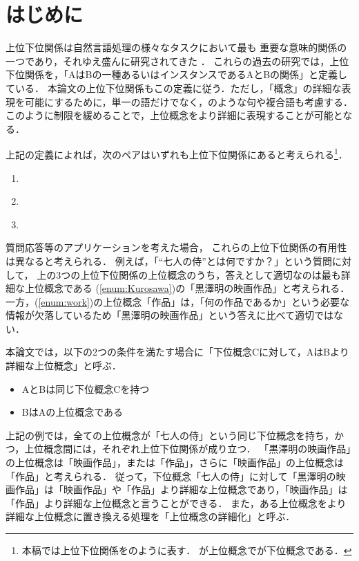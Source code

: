 \documentclass[japanese]{jnlp_1.4}
\newcommand{\xmp}[1]{}
\newcommand{\isa}[2]{}
\begin{document}
\maketitle


\section{はじめに}

上位下位関係は自然言語処理の様々なタスクにおいて最も
重要な意味的関係の一つであり，それゆえ盛んに研究されてきた
\cite{hearst92,hovy09,oh09,ponzetto07,隅田:吉永:鳥澤:2009,suchanek07,nastase08,snow05}．
これらの過去の研究では，上位下位関係を，「AはBの一種あるいはインスタンスであるAとBの関係」と定義している．
本論文の上位下位関係もこの定義に従う．ただし，「概念」の詳細な表現を可能にするために，単一の語だけでなく，\xmp{黒澤明の映画作品}のような句や複合語も考慮する．
このように制限を緩めることで，上位概念をより詳細に表現することが可能となる．

上記の定義によれば，次のペアはいずれも上位下位関係にあると考えられる\footnote{
本稿では上位下位関係を\isa{A}{B}のように表す．
\xmp{A}が上位概念で\xmp{B}が下位概念である．
}．
\begin{enumerate}
\item \isa{黒澤明の映画作品}{七人の侍}
	\label{enum:Kurosawa}
\item \isa{映画作品}{七人の侍}
\item \isa{作品}{七人の侍}
	\label{enum:work}
\end{enumerate}


質問応答等のアプリケーションを考えた場合，
これらの上位下位関係の有用性は異なると考えられる．
例えば，「``七人の侍''とは何ですか？」という質問に対して，
上の3つの上位下位関係の上位概念のうち，答えとして適切なのは最も詳細な上位概念である
(\ref{enum:Kurosawa})の「黒澤明の映画作品」と考えられる．
一方，(\ref{enum:work})の上位概念「作品」は，「何の作品であるか」という必要な情報が欠落しているため「黒澤明の映画作品」という答えに比べて適切ではない．

本論文では，以下の2つの条件を満たす場合に「下位概念Cに対して，AはBより詳細な上位概念」と呼ぶ．
\begin{itemize}
\item AとBは同じ下位概念Cを持つ
\item BはAの上位概念である
\end{itemize}
上記の例では，全ての上位概念が「七人の侍」という同じ下位概念を持ち，かつ，上位概念間には，それぞれ上位下位関係が成り立つ．
「黒澤明の映画作品」の上位概念は「映画作品」，または「作品」，さらに「映画作品」の上位概念は「作品」と考えられる．
従って，下位概念「七人の侍」に対して「黒澤明の映画作品」は「映画作品」や「作品」より詳細な上位概念であり，「映画作品」は「作品」より詳細な上位概念と言うことができる．
また，ある上位概念をより詳細な上位概念に置き換える処理を「上位概念の詳細化」と呼ぶ．
\end{document}

